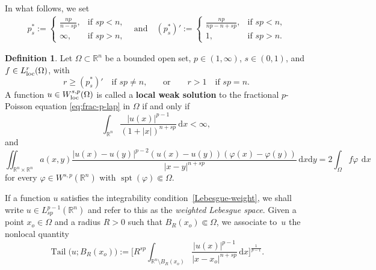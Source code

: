 \documentclass[10pt,letterpaper]{amsart}
\theoremstyle{definition}
\newtheorem{definition}[theorem]{Definition}
\numberwithin{theorem}{section}
\numberwithin{equation}{section}
\newcommand{\R}{\ensuremath{\mathbb{R}}}
\newcommand{\spt}{\operatorname{spt}}
\newcommand{\1}{\ensuremath{\mathds{1}}}
\renewcommand{\d}{\:\! \mathrm{d}}
\numberwithin{equation}{section}
\begin{document}
In what follows, we set 
\begin{align*}
    p_s^\ast 
    :=
    \left\{
    \begin{array}{cl}
        \frac{np}{n-sp}, & \mbox{if $sp<n$,}\\[5pt]
        \infty, & \mbox{if $sp>n$,}
    \end{array}
    \right.
    \quad\mbox{and}\quad
    (p_s^\ast)'
    :=
    \left\{
    \begin{array}{cl}
        \frac{np}{np-n+sp}, & \mbox{if $sp<n$,}\\[5pt]
        1, & \mbox{if $sp>n$.}
    \end{array}
    \right.
\end{align*}

\begin{definition}\label{def:weak-sol}
Let $\Omega\subset\mathbb R^n$ be a bounded open set, $p\in(1,\infty)$, $s\in(0,1)$, and $f\in L^{r}_{\rm loc}(\Omega)$, with
$$
    r\ge (p_s^\ast)'\quad\mbox{if $sp\not=n$,}
    \qquad\mbox{or}\qquad 
    r>1 \quad\mbox{if $sp=n$.}
$$
A function $u\in W^{s,p}_{\rm loc}(\Omega)$
is called a  {\bf local weak solution} to the fractional $p$-Poisson equation \eqref{eq:frac-p-lap} in $\Omega$ if and only if
\begin{equation}\label{Lebesgue-weight}
\int_{\mathbb R^n}\frac{|u(x)|^{p-1}}{(1+|x|)^{n+sp}}\, \mathrm{d}x <\infty,
\end{equation}
and
\begin{equation*}
        \iint_{\mathbb R^n\times\mathbb R^n}a(x,y)\frac{|u(x)-u(y)|^{p-2}(u(x)-u(y))(\varphi(x)-\varphi(y))}{|x-y|^{n+sp}}\,\mathrm{d}x \mathrm{d}y =2\int_{\Omega} f \varphi \, \d x
\end{equation*}
for every $\varphi\in W^{s,p}(\R^n)$ with $\spt(\varphi)\Subset\Omega$.
\end{definition}
If a function $u$ satisfies the integrability condition~\eqref{Lebesgue-weight}, we shall write 
$u\in L^{p-1}_{sp}(\mathbb{R}^n)$ and refer to this as the \emph{weighted Lebesgue space}.  
Given a point $x_o\in\Omega$ and a radius $R>0$ such that $B_R(x_o)\Subset\Omega$, we associate to~$u$ the nonlocal quantity
\begin{equation*}%
    \operatorname{Tail}\big(u;B_R(x_o)\big)
    :=
    \biggl[
    R^{sp}\int_{\mathbb{R}^n\setminus B_R(x_o)}
    \frac{|u(x)|^{p-1}}{|x-x_o|^{n+sp}}\,\mathrm{d}x
    \biggr]^{\frac{1}{p-1}}.
\end{equation*}
\end{document}
